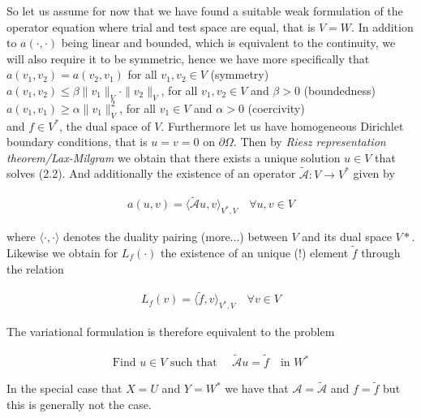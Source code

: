 \documentclass[../draft_1.tex]{subfiles}
\begin{document}
So let us assume for now that we have found a suitable weak formulation of the operator equation where trial and test space are equal, that is $V = W$. In addition to $a(\cdot, \cdot)$ being linear and bounded, which is equivalent to the continuity, we will also require it to be symmetric, hence we have more specifically that
\bigskip
\\
$a(v_1, v_2) = a(v_2, v_1)$ for all  $v_1, v_2 \in V$ (symmetry) \\
$a(v_1, v_2) \leq \beta \|v_1\|_V \cdot \|v_2\|_V $, for all $v_1, v_2 \in V$ and $\beta > 0$ (boundedness) \\ $a(v_1, v_1) \geq \alpha \|v_1\|_V^2$, for all $v_1 \in V$ and $\alpha > 0$ (coercivity)
\bigskip
\\
and $f \in V^*$, the dual space of $V$. Furthermore let us have homogeneous Dirichlet boundary conditions, that is $u = v = 0$ on $\partial \Omega$. Then by \textit{Riesz representation theorem/Lax-Milgram} we obtain that there exists a unique solution $u \in V$ that solves (2.2). And additionally the existence of an operator $\tilde{\mathcal{A}} : V \rightarrow V^*$ given by
\begin{ceqn}
\begin{align}
a(u,v) = \langle \tilde{\mathcal{A}} u, v \rangle_{V^*, V} \quad \forall u, v \in V
\end{align}
\end{ceqn}
where $\langle \cdot, \cdot \rangle$ denotes the duality pairing (more...) between $V$ and its dual space $V*$. Likewise we obtain for $L_f(\cdot)$ the existence of an unique (!) element $\tilde{f}$ through the relation
\begin{ceqn}
\begin{align}
L_f(v) = \langle \tilde{f}, v \rangle_{V^*, V} \quad \forall v \in V
\end{align} 
\end{ceqn}
The variational formulation is therefore equivalent to the problem 
\begin{ceqn}
\begin{align}
\text{Find } u \in V \text{ such that } \quad \tilde{\mathcal{A}} u = \tilde{f} \quad  \text{in } W^*
\end{align}
\end{ceqn}
In the special case that $X = U$ and $Y = W^*$ we have that $ \mathcal{A} = \tilde{\mathcal{A}}$ and $ f = \tilde{f}$ but this is generally not the case. 
\end{document}
